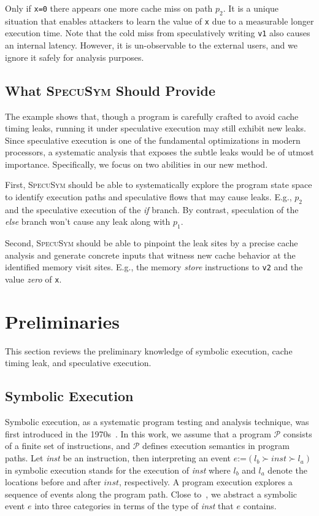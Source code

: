 \documentclass[sigconf]{acmart}
\newcommand{\SpecuSym}{\textsc{SpecuSym} }
\newcommand{\prog}{\mathcal{P}}
\begin{document}
Only if \texttt{x=0} there appears one more cache miss on path $p_2$. It is a 
unique situation that enables attackers to learn the value of \texttt{x} due to 
a measurable longer execution time. Note that the cold miss from speculatively 
writing \texttt{v1} also causes an internal latency. However, it is un-observable 
to the external users, and we ignore it safely for analysis purposes.


\subsection{What \SpecuSym Should Provide}
\label{sec:app-scenarios}

The example shows that, though a program is carefully crafted to avoid cache 
timing leaks, running it under speculative execution may still exhibit new 
leaks. Since speculative execution is one of the fundamental optimizations 
in modern processors, a systematic analysis that exposes the subtle leaks 
would be of utmost importance. Specifically, we focus on two abilities in 
our new method.


First, \SpecuSym should be able to systematically explore the program state 
space to identify execution paths and speculative flows that may cause leaks. 
E.g., $\mathit{p_2}$ and the speculative execution of the \textit{if} branch. 
By contrast, speculation of the \textit{else} branch won't cause any leak along 
with $\mathit{p_1}$.


Second, \SpecuSym should be able to pinpoint the leak sites by a precise cache 
analysis and generate concrete inputs that witness new cache behavior at the 
identified memory visit sites. E.g., the memory \textit{store} instructions to 
\texttt{v2} and the value \textit{zero} of \texttt{x}.


\section{Preliminaries}
\label{sec:prelim}

This section reviews the preliminary knowledge of symbolic execution, cache timing leak, 
and speculative execution.


\subsection{Symbolic Execution}
\label{sec:se}




Symbolic execution, as a systematic program testing and analysis technique, 
was first introduced in the 1970s~\cite{King76,Clarke76}. In this work, we 
assume that a program $\prog$ consists of a finite set of instructions, and 
$\prog$ defines execution semantics in program paths. Let \textit{inst} be 
an instruction, then interpreting an event $e$:=$(l_b\succ inst\succ l_a)$ 
in symbolic execution stands for the execution of \textit{inst} where $l_b$ 
and $l_a$ denote the locations before and after $inst$, respectively. A 
program execution explores a sequence of events along the program path. 
Close to~\cite{GuoKWYG15,GuoWW18}, we abstract a symbolic event $e$ into 
three categories in terms of the type of \textit{inst} that $e$ contains.
\end{document}
